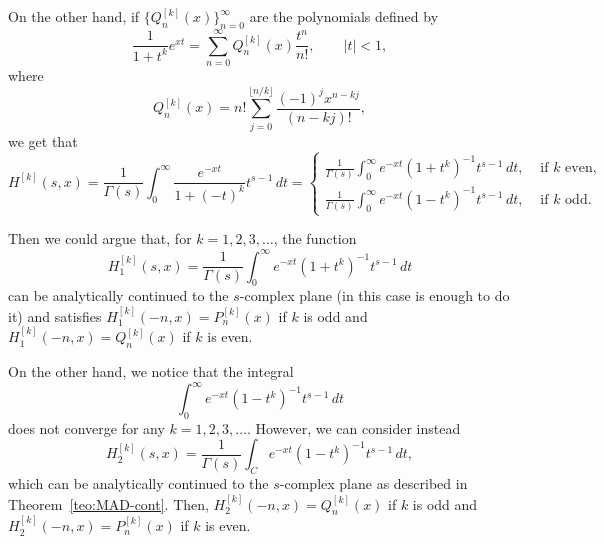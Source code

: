 \documentclass[11pt,a4paper]{amsart}
\theoremstyle{plain}
\theoremstyle{plain}
\theoremstyle{remark}
\numberwithin{equation}{section}
\begin{document}
On the other hand, if $\{Q_n^{[k]}(x)\}_{n=0}^{\infty}$ are the polynomials defined by
\begin{equation*}
  \frac{1}{1+t^k} e^{xt} = \sum_{n=0}^{\infty} Q_n^{[k]}(x) \frac{t^n}{n!},
  \qquad |t| < 1,
\end{equation*}
where
\[
  Q_n^{[k]}(x) = n!\sum_{j=0}^{\lfloor {n}/{k} \rfloor} \frac{(-1)^j x^{n-kj}}{(n-kj)!},
\]
we get that
\begin{equation*}
  H^{[k]}(s,x) 
  = \frac{1}{\Gamma(s)}\int_{0}^{\infty} \frac{e^{-xt}}{1+(-t)^k} t^{s-1}\,dt 
  = 
\begin{cases}
  \frac{1}{\Gamma(s)}\int_{0}^{\infty} e^{-xt}(1+t^k)^{-1} t^{s-1}\, dt, 
    & \text{ if } k \text{ even,} \\[6pt]
  \frac{1}{\Gamma(s)}\int_{0}^{\infty} e^{-xt}(1-t^k)^{-1} t^{s-1}\, dt, 
    & \text{ if } k \text{ odd.} 
\end{cases}
\end{equation*}

Then we could argue that, for $k=1,2,3,\dots$, the function
\begin{equation*}
  H_1^{[k]}(s,x) = \frac{1}{\Gamma(s)}\int_{0}^{\infty} e^{-xt}(1+t^k)^{-1} t^{s-1}\, dt
\end{equation*}
can be analytically continued to the $s$-complex plane (in this case \cite[Theorem~1]{NRV} is enough to do it) and satisfies $H_1^{[k]}(-n,x) = P_n^{[k]}(x)$ if $k$ is odd and $H_1^{[k]}(-n,x) = Q_n^{[k]}(x)$ if $k$ is even.

On the other hand, we notice that the integral
\[
  \int_{0}^{\infty} e^{-xt}(1-t^k)^{-1} t^{s-1}\, dt
\]
does not converge for any $k=1,2,3,\dots$. However, we can consider instead
\begin{equation*}
  H_2^{[k]}(s,x) = \frac{1}{\Gamma(s)}\int_{C} e^{-xt}(1-t^k)^{-1} t^{s-1}\, dt,
\end{equation*}
which can be analytically continued to the $s$-complex plane as described in Theorem~\ref{teo:MAD-cont}.
Then, $H_2^{[k]}(-n,x) = Q_n^{[k]}(x)$ if $k$ is odd and $H_2^{[k]}(-n,x) = P_n^{[k]}(x)$ if $k$ is even.
\end{document}
